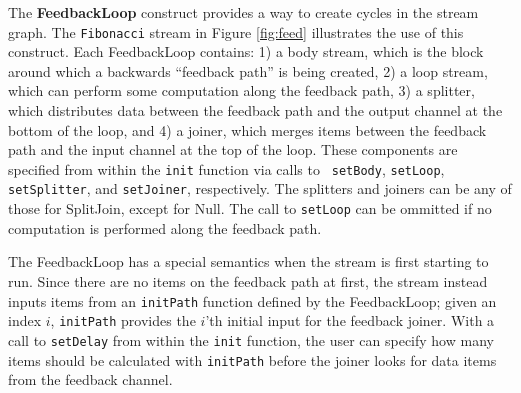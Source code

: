 The {\bf FeedbackLoop} construct provides a way to create cycles in the
stream graph.  The {\tt Fibonacci} stream in Figure \ref{fig:feed}
illustrates the use of this construct.  Each FeedbackLoop contains: 1) a
body stream, which is the block around which a backwards ``feedback
path'' is being created, 2) a loop stream, which can perform some
computation along the feedback path, 3) a splitter, which distributes
data between the feedback path and the output channel at the bottom of
the loop, and 4) a joiner, which merges items between the feedback path
and the input channel at the top of the loop.  These components are
specified from within the {\tt init} function via calls to {\tt
setBody}, {\tt setLoop}, {\tt setSplitter}, and {\tt setJoiner},
respectively.
%
%
The splitters and joiners can be any of those for SplitJoin, except for
Null.  The call to {\tt setLoop} can be ommitted if no computation is
performed along the feedback path.

The FeedbackLoop has a special semantics when the stream is first
starting to run.  Since there are no items on the feedback path at
first, the stream instead inputs items from an {\tt initPath} function
defined by the FeedbackLoop; given an index $i$, {\tt initPath}
provides the $i$'th initial input for the feedback joiner.  With a
call to {\tt setDelay} from within the {\tt init} function, the user
can specify how many items should be calculated with {\tt initPath}
before the joiner looks for data items from the feedback channel.


